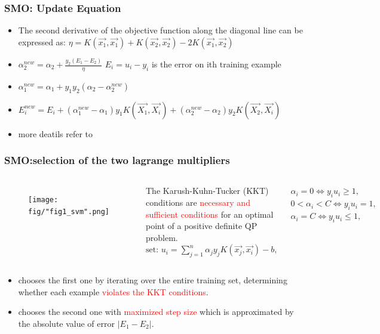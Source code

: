 \documentclass{beamer}
\begin{document}
\begin{frame}
	\frametitle{SMO: Update Equation}	 
	\begin{itemize}
		\item The second derivative of the objective function along the diagonal line can be expressed as:
		$\eta = K(\vec{x_1},\vec{x_1})+K(\vec{x_2},\vec{x_2})-2K(\vec{x_1},\vec{x_2})$ 
		\item $\alpha_{2}^{new} = \alpha_2 + \frac{y_2(E_1-E_2)}{\eta}$  $E_i = u_i-y_i $ is the error on ith training example 
		\item $\alpha_{1}^{new} = \alpha_1 + y_1y_2(\alpha_2-\alpha_{2}^{new})$

		\item $E_{i}^{new} = E_i + (\alpha_{1}^{new}-\alpha_1)y_1K(\vec{X_1},\vec{X_i}) + (\alpha_{2}^{new}-\alpha_2)y_2K(\vec{X_2},\vec{X_i})$	
		\item more deatils refer to \cite{Platt}
		
	\end{itemize}	
	
	
\end{frame}



\begin{frame}
	\frametitle{SMO:selection of the two lagrange multipliers}	 

		\begin{columns}[c] %
			
			\begin{figure}
				\texttt{[image: fig/"fig1\_svm".png]}
				
			\end{figure}
			
			
			The Karush-Kuhn-Tucker (KKT) conditions are \textcolor{red}{necessary and sufficient conditions} for an
			optimal point of a positive definite QP problem. \\
			$ \text{set: } u_i = \sum_{j=1}^{n}\alpha_jy_jK(\vec{x_j},\vec{x_i})-b, $\\ 
			
			$ \alpha_i=0 \Leftrightarrow y_iu_i \geq 1, $ \\
			$ 0 < \alpha_i < C \Leftrightarrow y_iu_i = 1,$\\
			$ \alpha_i=C \Leftrightarrow y_iu_i \leq 1,$
		\end{columns}
			\begin{itemize}
		\item chooses the first one by iterating over the entire training set, determining whether each example \textcolor{red}{violates the KKT
		conditions}.
		\item chooses the second one with \textcolor{red}{maximized step size} which is approximated by the absolute value of error $|E_1-E_2|$.
	\end{itemize}	
\end{frame}
\end{document}
